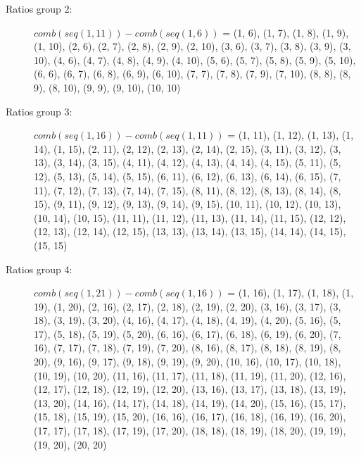 \documentclass[letterpaper,10pt,english]{sphinxmanual}
\begin{document}
\begin{itemize}
\begin{description}
\item[{Ratios group 2:}] \leavevmode
$comb(seq(1,11)) - comb(seq(1,6))$ =
(1, 6), (1, 7), (1, 8), (1, 9), (1, 10), (2, 6), (2, 7), (2, 8),
(2, 9), (2, 10), (3, 6), (3, 7), (3, 8), (3, 9), (3, 10), (4, 6),
(4, 7), (4, 8), (4, 9), (4, 10), (5, 6), (5, 7), (5, 8), (5, 9),
(5, 10), (6, 6), (6, 7), (6, 8), (6, 9), (6, 10), (7, 7), (7, 8),
(7, 9), (7, 10), (8, 8), (8, 9), (8, 10), (9, 9), (9, 10), (10, 10)

\item[{Ratios group 3:}] \leavevmode
$comb(seq(1,16)) - comb(seq(1,11))$ =
(1, 11), (1, 12), (1, 13), (1, 14), (1, 15), (2, 11), (2, 12),
(2, 13), (2, 14), (2, 15), (3, 11), (3, 12), (3, 13), (3, 14),
(3, 15), (4, 11), (4, 12), (4, 13), (4, 14), (4, 15), (5, 11),
(5, 12), (5, 13), (5, 14), (5, 15), (6, 11), (6, 12), (6, 13),
(6, 14), (6, 15), (7, 11), (7, 12), (7, 13), (7, 14), (7, 15),
(8, 11), (8, 12), (8, 13), (8, 14), (8, 15), (9, 11), (9, 12),
(9, 13), (9, 14), (9, 15), (10, 11), (10, 12), (10, 13), (10, 14),
(10, 15), (11, 11), (11, 12), (11, 13), (11, 14), (11, 15),
(12, 12), (12, 13), (12, 14), (12, 15), (13, 13), (13, 14),
(13, 15), (14, 14), (14, 15), (15, 15)

\item[{Ratios group 4:}] \leavevmode
$comb(seq(1,21)) - comb(seq(1,16))$ =
(1, 16), (1, 17), (1, 18), (1, 19), (1, 20), (2, 16), (2, 17),
(2, 18), (2, 19), (2, 20), (3, 16), (3, 17), (3, 18), (3, 19),
(3, 20), (4, 16), (4, 17), (4, 18), (4, 19), (4, 20), (5, 16),
(5, 17), (5, 18), (5, 19), (5, 20), (6, 16), (6, 17), (6, 18),
(6, 19), (6, 20), (7, 16), (7, 17), (7, 18), (7, 19), (7, 20),
(8, 16), (8, 17), (8, 18), (8, 19), (8, 20), (9, 16), (9, 17),
(9, 18), (9, 19), (9, 20), (10, 16), (10, 17), (10, 18), (10, 19),
(10, 20), (11, 16), (11, 17), (11, 18), (11, 19), (11, 20),
(12, 16), (12, 17), (12, 18), (12, 19), (12, 20), (13, 16),
(13, 17), (13, 18), (13, 19), (13, 20), (14, 16), (14, 17),
(14, 18), (14, 19), (14, 20), (15, 16), (15, 17), (15, 18),
(15, 19), (15, 20), (16, 16), (16, 17), (16, 18), (16, 19),
(16, 20), (17, 17), (17, 18), (17, 19), (17, 20), (18, 18),
(18, 19), (18, 20), (19, 19), (19, 20), (20, 20)


\end{description}
\end{itemize}
\end{document}
